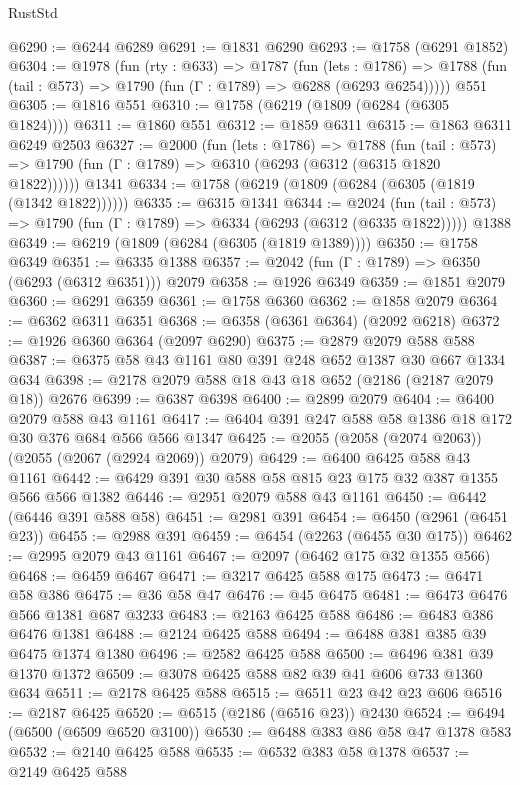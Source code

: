 \begin{lexlean}{RustStd}
\begin{coremodule}
@6290 := @6244 @6289
@6291 := @1831 @6290
@6293 := @1758 (@6291 @1852)
@6304 := @1978
    (fun (rty : @633) =>
    @1787
      (fun (lets : @1786) =>
      @1788 (fun (tail : @573) => @1790 (fun (Γ : @1789) => @6288 (@6293 @6254)))))
    @551
@6305 := @1816 @551
@6310 := @1758 (@6219 (@1809 (@6284 (@6305 @1824))))
@6311 := @1860 @551
@6312 := @1859 @6311
@6315 := @1863 @6311 @6249 @2503
@6327 := @2000
    (fun (lets : @1786) =>
    @1788
      (fun (tail : @573) => @1790 (fun (Γ : @1789) => @6310 (@6293 (@6312 (@6315 @1820 @1822))))))
    @1341
@6334 := @1758 (@6219 (@1809 (@6284 (@6305 (@1819 (@1342 @1822))))))
@6335 := @6315 @1341
@6344 := @2024
    (fun (tail : @573) => @1790 (fun (Γ : @1789) => @6334 (@6293 (@6312 (@6335 @1822)))))
    @1388
@6349 := @6219 (@1809 (@6284 (@6305 (@1819 @1389))))
@6350 := @1758 @6349
@6351 := @6335 @1388
@6357 := @2042 (fun (Γ : @1789) => @6350 (@6293 (@6312 @6351))) @2079
@6358 := @1926 @6349
@6359 := @1851 @2079
@6360 := @6291 @6359
@6361 := @1758 @6360
@6362 := @1858 @2079
@6364 := @6362 @6311 @6351
@6368 := @6358 (@6361 @6364) (@2092 @6218)
@6372 := @1926 @6360 @6364 (@2097 @6290)
@6375 := @2879 @2079 @588 @588
@6387 := @6375 @58 @43 @1161 @80 @391 @248 @652 @1387 @30 @667 @1334 @634
@6398 := @2178 @2079 @588 @18 @43 @18 @652 (@2186 (@2187 @2079 @18)) @2676
@6399 := @6387 @6398
@6400 := @2899 @2079
@6404 := @6400 @2079 @588 @43 @1161
@6417 := @6404 @391 @247 @588 @58 @1386 @18 @172 @30 @376 @684 @566 @566 @1347
@6425 := @2055 (@2058 (@2074 @2063)) (@2055 (@2067 (@2924 @2069)) @2079)
@6429 := @6400 @6425 @588 @43 @1161
@6442 := @6429 @391 @30 @588 @58 @815 @23 @175 @32 @387 @1355 @566 @566 @1382
@6446 := @2951 @2079 @588 @43 @1161
@6450 := @6442 (@6446 @391 @588 @58)
@6451 := @2981 @391
@6454 := @6450 (@2961 (@6451 @23))
@6455 := @2988 @391
@6459 := @6454 (@2263 (@6455 @30 @175))
@6462 := @2995 @2079 @43 @1161
@6467 := @2097 (@6462 @175 @32 @1355 @566)
@6468 := @6459 @6467
@6471 := @3217 @6425 @588 @175
@6473 := @6471 @58 @386
@6475 := @36 @58 @47
@6476 := @45 @6475
@6481 := @6473 @6476 @566 @1381 @687 @3233
@6483 := @2163 @6425 @588
@6486 := @6483 @386 @6476 @1381
@6488 := @2124 @6425 @588
@6494 := @6488 @381 @385 @39 @6475 @1374 @1380
@6496 := @2582 @6425 @588
@6500 := @6496 @381 @39 @1370 @1372
@6509 := @3078 @6425 @588 @82 @39 @41 @606 @733 @1360 @634
@6511 := @2178 @6425 @588
@6515 := @6511 @23 @42 @23 @606
@6516 := @2187 @6425
@6520 := @6515 (@2186 (@6516 @23)) @2430
@6524 := @6494 (@6500 (@6509 @6520 @3100))
@6530 := @6488 @383 @86 @58 @47 @1378 @583
@6532 := @2140 @6425 @588
@6535 := @6532 @383 @58 @1378
@6537 := @2149 @6425 @588

\end{coremodule}
\end{lexlean}
